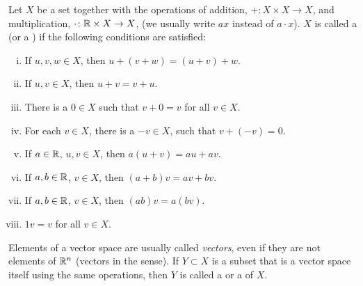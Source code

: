 \begin{defn}
Let $X$ be a set together with
the operations of addition, $+ \colon X \times X \to X$,
and multiplication, $\cdot \colon {\mathbb{R}} \times X \to X$, (we usually write $ax$ instead of $a
\cdot x$).  $X$ is called a \emph{} (or a
\emph{})
if the following conditions are satisfied:
\begin{enumerate}[(i)]
\item
If $u, v, w \in X$, then $u+(v+w) = (u+v)+w$.
\item
If $u, v \in X$, then $u+v = v+u$.
\item \label{vecspacedefn:addidentity}
There is a $0 \in X$ such that $v+0=v$ for all $v \in X$.
\item \label{vecspacedefn:addinverse}
For each $v \in X$, there is a $-v \in X$,
such that $v+(-v)=0$.
\item
If $a \in {\mathbb{R}}$, $u,v \in X$, then
$a(u+v) = au+av$.
\item
If $a,b \in {\mathbb{R}}$, $v \in X$, then
$(a+b)v = av+bv$.
\item
If $a,b \in {\mathbb{R}}$, $v \in X$, then
$(ab)v = a(bv)$.
\item
$1v = v$ for all $v \in X$.
\end{enumerate}
Elements of a vector space are usually called \emph{vectors},
even if they
are not elements of ${\mathbb{R}}^n$ (vectors in the  sense).
%
If $Y \subset X$ is a subset that is a vector space itself using the same
operations, then $Y$ is called a \emph{} or
a \emph{} of $X$.
\end{defn}

